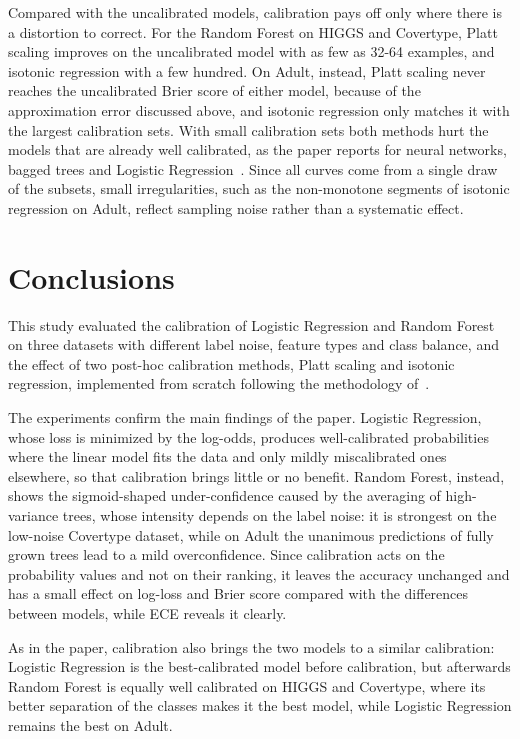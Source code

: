 \documentclass[a4paper, 10pt]{article}
\begin{document}
Compared with the uncalibrated models, calibration pays off only where there is a distortion to correct. For the Random Forest on HIGGS and Covertype, Platt scaling improves on the uncalibrated model with as few as 32-64 examples, and isotonic regression with a few hundred. On Adult, instead, Platt scaling never reaches the uncalibrated Brier score of either model, because of the approximation error discussed above, and isotonic regression only matches it with the largest calibration sets. With small calibration sets both methods hurt the models that are already well calibrated, as the paper reports for neural networks, bagged trees and Logistic Regression~\cite{niculescu2005predicting}. Since all curves come from a single draw of the subsets, small irregularities, such as the non-monotone segments of isotonic regression on Adult, reflect sampling noise rather than a systematic effect.



\section{Conclusions}
This study evaluated the calibration of Logistic Regression and Random Forest on three datasets with different label noise, feature types and class balance, and the effect of two post-hoc calibration methods, Platt scaling and isotonic regression, implemented from scratch following the methodology of~\cite{niculescu2005predicting}.
 
The experiments confirm the main findings of the paper. Logistic Regression, whose loss is minimized by the log-odds, produces well-calibrated probabilities where the linear model fits the data and only mildly miscalibrated ones elsewhere, so that calibration brings little or no benefit. Random Forest, instead, shows the sigmoid-shaped under-confidence caused by the averaging of high-variance trees, whose intensity depends on the label noise: it is strongest on the low-noise Covertype dataset, while on Adult the unanimous predictions of fully grown trees lead to a mild overconfidence. Since calibration acts on the probability values and not on their ranking, it leaves the accuracy unchanged and has a small effect on log-loss and Brier score compared with the differences between models, while ECE reveals it clearly.

As in the paper, calibration also brings the two models to a similar calibration: Logistic Regression is the best-calibrated model before calibration, but afterwards Random Forest is equally well calibrated on HIGGS and Covertype, where its better separation of the classes makes it the best model, while Logistic Regression remains the best on Adult.
 
\end{document}
